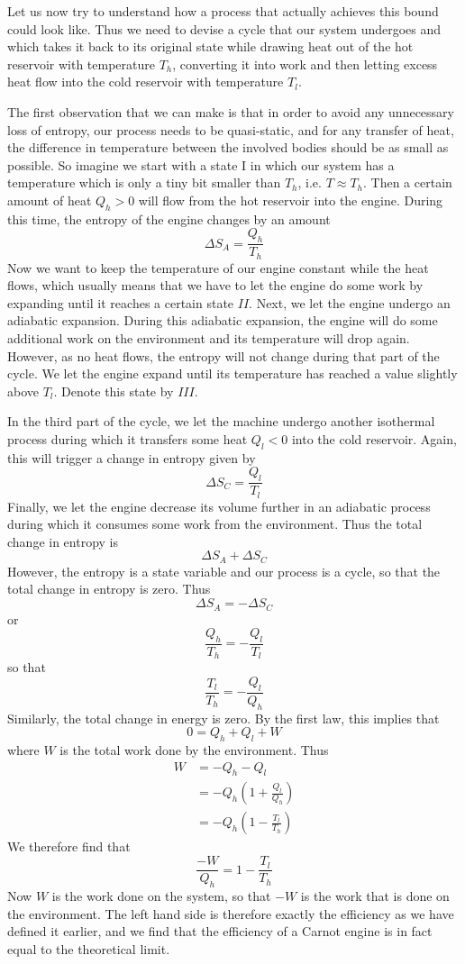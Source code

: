 \documentclass[a4paper, draft]{article}
\theoremstyle{own}
\theoremstyle{remark}
\begin{document}
Let us now try to understand how a process that actually achieves this bound could look like. Thus we need to devise a cycle that our system undergoes and which takes it back to its original state while drawing heat out of the hot reservoir with temperature $T_h$, converting it into work and then letting excess heat flow into the cold reservoir with temperature $T_l$. 

The first observation that we can make is that in order to avoid any unnecessary loss of entropy, our process needs to be quasi-static, and for any transfer of heat, the difference in temperature between the involved bodies should be as small as possible. So imagine we start with a state I in which our system has a temperature which is only a tiny bit smaller than $T_h$, i.e. $T \approx T_h$. Then a certain amount of heat $Q_h > 0$ will flow from the hot reservoir into the engine. During this time, the entropy of the engine changes by an amount
$$
\Delta S_A = \frac{Q_h}{T_h}
$$
Now we want to keep the temperature of our engine constant while the heat flows, which usually means that we have to let the engine do some work by expanding until it reaches a certain state $II$. Next, we let the engine undergo an adiabatic expansion. During this adiabatic expansion, the engine will do some additional work on the environment and its temperature will drop again. However, as no heat flows, the entropy will not change during that part of the cycle. We let the engine expand until its temperature has reached a value slightly above $T_l$. Denote this state by  $III$. 

In the third part of the cycle, we let the machine undergo another isothermal process during which it transfers some heat $Q_l < 0$ into the cold reservoir. Again, this will trigger a change in entropy given by 
$$
\Delta S_C = \frac{Q_l}{T_l}
$$
Finally, we let the engine decrease its volume further in an adiabatic process during which it consumes some work from the environment. Thus the total change in entropy is 
$$
\Delta S_A + \Delta S_C
$$
However, the entropy is a state variable and our process is a cycle, so that the total change in entropy is zero. Thus
$$
\Delta S_A  = -  \Delta S_C
$$
or 
$$
\frac{Q_h}{T_h} = - \frac{Q_l}{T_l}
$$
so that
$$
\frac{T_l}{T_h} = - \frac{Q_l}{Q_h}
$$
Similarly, the total change in energy is zero. By the first law, this implies that
$$
0 = Q_h + Q_l + W
$$
where $W$ is the total work done by the environment. Thus
\begin{align*}
W &= - Q_h - Q_l  \\
&= - Q_h (1 + \frac{Q_l}{Q_h}) \\
&= - Q_h  (1 - \frac{T_l}{T_h})
\end{align*}
We therefore find that
$$
\frac{-W}{Q_h} = 1 - \frac{T_l}{T_h}
$$
Now $W$ is the work done on the system, so that $-W$ is the work that is done on the environment. The left hand side is therefore exactly the efficiency as we have defined it earlier, and we find that the efficiency of a Carnot engine is in fact equal to the theoretical limit. 
\end{document}
